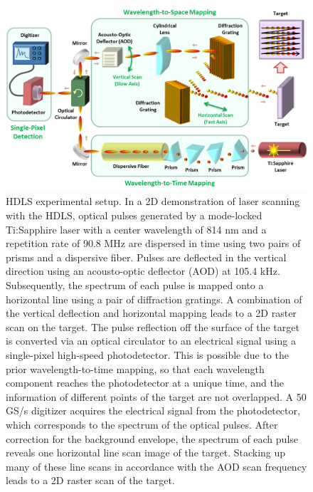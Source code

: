\begin{figure}[htb!]
\centering
\includegraphics[scale=0.65]{PW2013/Figure2.png}
\caption{HDLS experimental setup. In a 2D demonstration of laser scanning with the HDLS, optical pulses generated by a mode-locked Ti:Sapphire laser with a center wavelength of 814 nm and a repetition rate of 90.8 MHz are dispersed in time using two pairs of prisms and a dispersive fiber. Pulses are deflected in the vertical direction using an acousto-optic deflector (AOD) at 105.4 kHz. Subsequently, the spectrum of each pulse is mapped onto a horizontal line using a pair of diffraction gratings. A combination of the vertical deflection and horizontal mapping leads to a 2D raster scan on the target. The pulse reflection off the surface of the target is converted via an optical circulator to an electrical signal using a single-pixel high-speed photodetector. This is possible due to the prior wavelength-to-time mapping, so that each wavelength component reaches the photodetector at a unique time, and the information of different points of the target are not overlapped. A 50 GS/s digitizer acquires the electrical signal from the photodetector, which corresponds to the spectrum of the optical pulses. After correction for the background envelope, the spectrum of each pulse reveals one horizontal line scan image of the target. Stacking up many of these line scans in accordance with the AOD scan frequency leads to a 2D raster scan of the target.}
\label{fig:PW2013_Figure2}
\end{figure}

